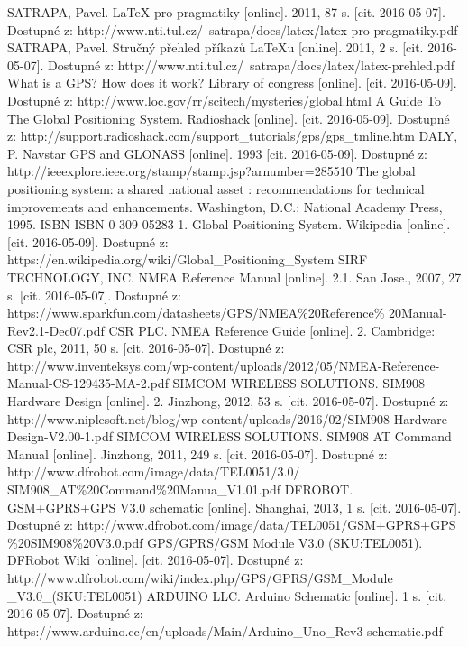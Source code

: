 \documentclass[FM,BP]{tulthesis}  %
\begin{document}
\begin{thebibliography}{References}
SATRAPA, Pavel. LaTeX pro pragmatiky [online]. 2011, 87 s. [cit. 2016-05-07]. Dostupné z: http://www.nti.tul.cz/~satrapa/docs/latex/latex-pro-pragmatiky.pdf
SATRAPA, Pavel. Stručný přehled příkazů LaTeXu [online]. 2011, 2 s. [cit. 2016-05-07]. Dostupné z: http://www.nti.tul.cz/~satrapa/docs/latex/latex-prehled.pdf
What is a GPS? How does it work? Library of congress [online]. [cit. 2016-05-09]. Dostupné z: http://www.loc.gov/rr/scitech/mysteries/global.html
A Guide To The Global Positioning System. Radioshack [online]. [cit. 2016-05-09]. Dostupné z: http://support.radioshack.com/support\_tutorials/gps/gps\_tmline.htm
DALY, P. Navstar GPS and GLONASS [online]. 1993 [cit. 2016-05-09]. Dostupné z: http://ieeexplore.ieee.org/stamp/stamp.jsp?arnumber=285510
The global positioning system: a shared national asset : recommendations for technical improvements and enhancements. Washington, D.C.: National Academy Press, 1995. ISBN ISBN 0-309-05283-1.
Global Positioning System. Wikipedia [online]. [cit. 2016-05-09]. Dostupné z: https://en.wikipedia.org/wiki/Global\_Positioning\_System
SIRF TECHNOLOGY, INC. NMEA Reference Manual [online]. 2.1. San Jose., 2007, 27 s. [cit. 2016-05-07]. Dostupné z: https://www.sparkfun.com/datasheets/GPS/NMEA\%20Reference\% 20Manual-Rev2.1-Dec07.pdf
CSR PLC. NMEA Reference Guide [online]. 2. Cambridge: CSR plc, 2011, 50 s. [cit. 2016-05-07]. Dostupné z: http://www.inventeksys.com/wp-content/uploads/2012/05/NMEA-Reference-Manual-CS-129435-MA-2.pdf
SIMCOM WIRELESS SOLUTIONS. SIM908 Hardware Design [online]. 2. Jinzhong, 2012, 53 s. [cit. 2016-05-07]. Dostupné z: http://www.niplesoft.net/blog/wp-content/uploads/2016/02/SIM908-Hardware-Design-V2.00-1.pdf
SIMCOM WIRELESS SOLUTIONS. SIM908 AT Command Manual [online]. Jinzhong, 2011, 249 s. [cit. 2016-05-07]. Dostupné z: http://www.dfrobot.com/image/data/TEL0051/3.0/ SIM908\_AT\%20Command\%20Manua\_V1.01.pdf
DFROBOT. GSM+GPRS+GPS V3.0 schematic [online]. Shanghai, 2013, 1 s. [cit. 2016-05-07]. Dostupné z: http://www.dfrobot.com/image/data/TEL0051/GSM+GPRS+GPS \%20SIM908\%20V3.0.pdf
GPS/GPRS/GSM Module V3.0 (SKU:TEL0051). DFRobot Wiki [online]. [cit. 2016-05-07]. Dostupné z: http://www.dfrobot.com/wiki/index.php/GPS/GPRS/GSM\_Module \_V3.0\_(SKU:TEL0051)
ARDUINO LLC. Arduino Schematic [online]. 1 s. [cit. 2016-05-07]. Dostupné z: https://www.arduino.cc/en/uploads/Main/Arduino\_Uno\_Rev3-schematic.pdf

\end{thebibliography}
\end{document}
